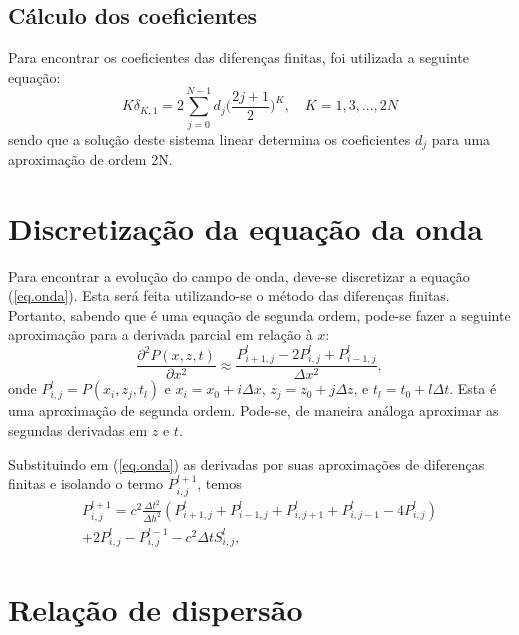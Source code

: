 \subsection{Cálculo dos coeficientes}
Para encontrar os coeficientes das diferenças finitas, foi utilizada a seguinte equação:
\begin{equation}
K\delta_{K,1}=2\sum_{j=0}^{N-1}d_j\Big(\frac{2j+1}{2}\Big)^K, \quad K=1, 3,...,2N \label{eq:coef}
\end{equation}
sendo que a solução deste sistema linear determina os coeficientes $d_j$ para uma aproximação de ordem 2N.
\section{Discretização da equação da onda}


Para encontrar a evolução do campo de onda, deve-se discretizar a equação 
(\ref{eq.onda}). Esta será feita utilizando-se o método das diferenças 
finitas. Portanto, sabendo que é 
uma equação de segunda ordem, pode-se fazer a seguinte aproximaç\~ao para a 
derivada parcial em rela\c{c}\~ao \`a $x$:
\begin{equation}
\frac{\partial^2P(x,z,t)}{\partial x^2}\approx\frac{P_{i+1,j}^{l}-2P_{i,j}^{l}+P_{i-1,j}^{l}}{\Delta x^2}, \label{dx2}
\end{equation}
onde $P_{i,j}^{l} = P(x_i,z_j,t_l)$ e $x_i = x_0 + i\Delta x$, $z_j = z_0 + 
j\Delta z$, e $t_l = t_0 + l\Delta t$. Esta \'e uma aproximação de segunda ordem. Pode-se, de maneira an\'aloga aproximar as segundas derivadas em $z$ e $t$.

Substituindo em (\ref{eq.onda}) as derivadas por suas aproxima\c{c}\~oes de diferen\c{c}as finitas e isolando o termo $P_{i,j}^{l+1}$, temos 
\begin{equation}
\begin{aligned}
P_{i,j}^{l+1}=c^2\frac{\Delta t^2}{\Delta h^2}(P_{i+1,j}^{l}+P_{i-1,j}^{l}+P_{i,j+1}^{l}+P_{i,j-1}^{l}-4P_{i,j}^{l}) \\
+ 2P_{i,j}^{l}-P_{i,j}^{l-1} - c^2 \Delta t S_{i,j}^l, \label{desenvol2}
\end{aligned}
\end{equation}

\section{Relação de dispersão}

